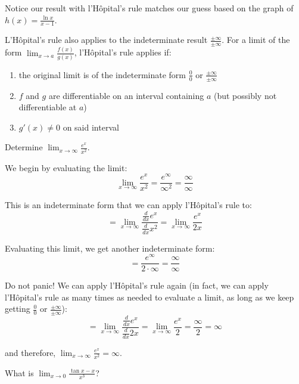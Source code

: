 Notice our result with l'H\^{o}pital's rule matches our guess based on the graph 
of $h(x) = \frac{\ln{x}}{x-1}$. 

L'H\^{o}pital's rule also applies to the indeterminate result $\frac{\pm \infty}
{\pm \infty}$. For a limit of the form $\lim_{x\to a}\frac{f(x)}{g(x)}$, 
l'H\^{o}pital's rule applies if:
\begin{enumerate}
    \item the original limit is of the indeterminate form $\frac{0}{0}$ or 
    $\frac{\pm \infty}{\pm \infty}$
    \item $f$ and $g$ are differentiable on an interval containing $a$ (but 
    possibly not differentiable at $a$)
    \item $g'(x) \neq 0$ on said interval
\end{enumerate}

\begin{Worked}
\begin{Problem}
Determine $\lim_{x \to \infty} \frac{e^x}{x^2}$.
\end{Problem}
\begin{Solution}
We begin by evaluating the limit:
$$\lim_{x \to \infty} \frac{e^x}{x^2} = \frac{e^{\infty}}{\infty^2} = 
\frac{\infty}{\infty}$$

This is an indeterminate form that we can apply l'H\^{o}pital's rule to:
$$= \lim_{x \to \infty} \frac{\frac{d}{dx}e^x}{\frac{d}{dx}x^2} = \lim_{x \to 
\infty} \frac{e^x}{2x}$$

Evaluating this limit, we get another indeterminate form:
$$=\frac{e^{\infty}}{2 \cdot \infty} = \frac{\infty}{\infty}$$

Do not panic! We can apply l'H\^{o}pital's rule again (in fact, we can apply 
l'H\^{o}pital's rule as many times as needed to evaluate a limit, as long as we 
keep getting $\frac{0}{0}$ or $\frac{\pm \infty}{\pm \infty}$):
$$= \lim_{x \to \infty} \frac{\frac{d}{dx}e^x}{\frac{d}{dx}2x} = \lim_{x \to 
\infty} \frac{e^x}{2} = \frac{\infty}{2} = \infty$$

and therefore, $\lim_{x \to \infty} \frac{e^x}{x^2} = \infty$.
\end{Solution}
\end{Worked}

\begin{Exercise}[label=LH1]
What is $\lim_{x \to 0} \frac{\tan{x} - x}{x^3}$?
\end{Exercise}


